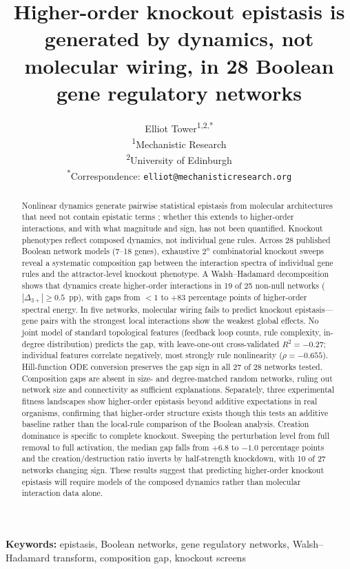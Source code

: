 \documentclass[10pt]{article}
\title{Higher-order knockout epistasis is generated by dynamics, not
molecular wiring, in 28 Boolean gene regulatory networks}
\author{
  Elliot Tower\textsuperscript{1,2,*} \\[4pt]
  \small\textsuperscript{1}Mechanistic Research \\
  \small\textsuperscript{2}University of Edinburgh \\
  \small\textsuperscript{*}Correspondence: \texttt{elliot@mechanisticresearch.org}
}
\begin{document}
\maketitle
\linenumbers
\doublespacing

\begin{abstract}
Nonlinear dynamics generate pairwise statistical epistasis from
molecular architectures that need not contain epistatic terms
\citep{gjuvsland2007statistical}; whether this extends to
higher-order interactions, and with what magnitude and sign, has not
been quantified. Knockout phenotypes reflect composed dynamics, not
individual gene rules. Across 28 published Boolean network models (7--18 genes), exhaustive
$2^n$ combinatorial knockout sweeps reveal a systematic composition
gap between the interaction spectra of individual gene rules and the
attractor-level knockout phenotype. A Walsh--Hadamard decomposition
shows that dynamics create higher-order interactions
in 19 of 25 non-null networks ($|\Delta_{3+}| \geq 0.5$~pp), with
gaps from $< 1$ to $+83$ percentage points of higher-order spectral
energy. In five networks, molecular wiring fails to predict knockout
epistasis---gene pairs with the strongest local interactions show the
weakest global effects. No joint model of standard
topological features (feedback loop counts, rule complexity,
in-degree distribution) predicts the gap, with leave-one-out
cross-validated $R^2 = -0.27$; individual features correlate
negatively, most strongly rule nonlinearity ($\rho = -0.655$). Hill-function ODE conversion preserves the gap sign in
all 27 of 28 networks tested. Composition gaps are absent in size- and
degree-matched random networks, ruling out network size and
connectivity as sufficient explanations. Separately, three experimental
fitness
landscapes show higher-order epistasis beyond additive expectations
in real organisms, confirming that higher-order structure exists
though this tests an additive baseline rather than the local-rule
comparison of the Boolean analysis. Creation dominance is specific to complete
knockout. Sweeping the perturbation level from full removal to full
activation, the median gap falls from $+6.8$ to $-1.0$ percentage points
and the creation/destruction ratio inverts by half-strength knockdown,
with 10 of 27 networks changing sign. These results suggest that predicting higher-order knockout
epistasis will require models of the composed dynamics rather than
molecular interaction data alone.
\end{abstract}

\noindent\textbf{Keywords:}
epistasis, Boolean networks, gene regulatory networks,
Walsh--Hadamard transform, composition gap, knockout screens
\end{document}
